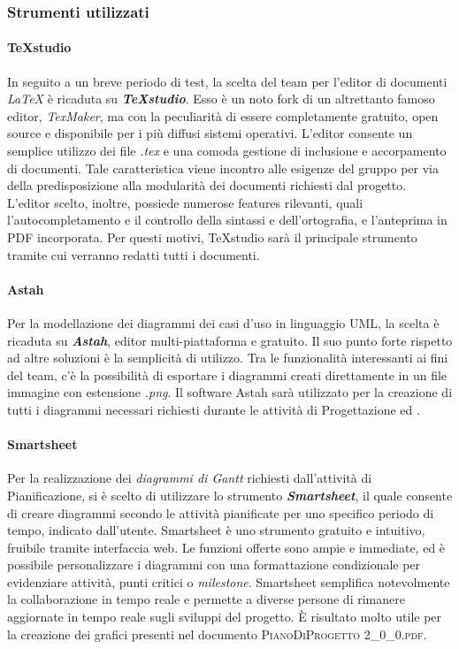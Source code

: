 	\subsubsection{Strumenti utilizzati}
	
		\paragraph{TeXstudio}
		In seguito a un breve periodo di test, la scelta del team per l'editor di documenti \textit{\LaTeX{}} è ricaduta su \textit{\textbf{TeXstudio}}. Esso è un noto fork di un altrettanto famoso editor, \textit{TexMaker}, ma con la peculiarità di essere completamente gratuito, open source e disponibile per i più diffusi sistemi operativi. L'editor consente un semplice utilizzo dei file \textit{.tex} e una comoda gestione di inclusione e accorpamento di documenti. Tale caratteristica viene incontro alle esigenze del gruppo per via della predisposizione alla modularità dei documenti richiesti dal progetto. L'editor scelto, inoltre, possiede numerose features rilevanti, quali l'autocompletamento e il controllo della sintassi e dell'ortografia, e l'anteprima in PDF incorporata. Per questi motivi, TeXstudio sarà il principale strumento tramite cui verranno redatti tutti i documenti.
	
		\paragraph{Astah}
		Per la modellazione dei diagrammi dei casi d'uso in linguaggio UML, la scelta è ricaduta su \textit{\textbf{Astah}}, editor multi-piattaforma e gratuito. Il suo punto forte rispetto ad altre soluzioni è la semplicità di utilizzo. Tra le funzionalità interessanti ai fini del team, c'è la possibilità di esportare i diagrammi creati direttamente in un file immagine con estensione \textit{.png}. Il software Astah sarà utilizzato per la creazione di tutti i diagrammi necessari richiesti durante le attività di Progettazione ed \AdR.
		
		\paragraph{Smartsheet}
		Per la realizzazione dei \textit{diagrammi di Gantt} richiesti dall'attività di Pianificazione, si è scelto di utilizzare lo strumento \textit{\textbf{Smartsheet}}, il quale consente di creare diagrammi secondo le attività pianificate per uno specifico periodo di tempo, indicato dall'utente.
		Smartsheet è uno strumento gratuito e intuitivo, fruibile tramite interfaccia web. Le funzioni offerte sono ampie e immediate, ed è possibile personalizzare i diagrammi con una formattazione condizionale per evidenziare attività, punti critici o \textit{milestone}. Smartsheet semplifica notevolmente la collaborazione in tempo reale e permette a diverse persone di rimanere aggiornate in tempo reale sugli sviluppi del progetto. \MakeUppercase{è} risultato molto utile per la creazione dei grafici presenti nel documento \textsc{PianoDiProgetto 2\_0\_0.pdf}.
		
